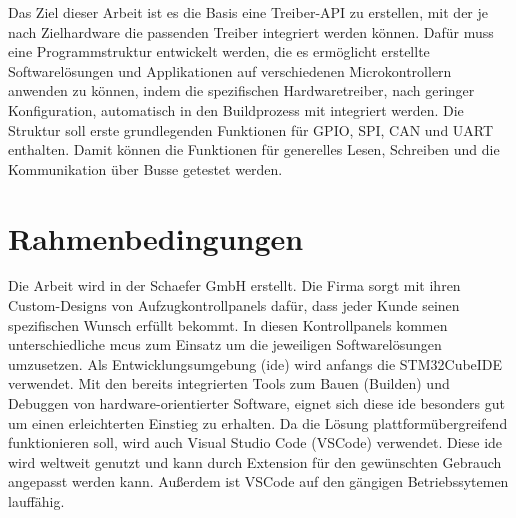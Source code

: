 Das Ziel dieser Arbeit ist es die Basis eine Treiber-API zu erstellen, mit der je nach Zielhardware die passenden Treiber integriert werden können.
Dafür muss eine Programmstruktur entwickelt werden, die es ermöglicht erstellte Softwarelösungen und Applikationen auf verschiedenen Microkontrollern anwenden zu können, indem die spezifischen Hardwaretreiber, nach geringer Konfiguration, automatisch in den Buildprozess mit integriert werden.
Die Struktur soll erste grundlegenden Funktionen für GPIO, SPI, CAN und UART enthalten. 
Damit können die Funktionen für generelles Lesen, Schreiben und die Kommunikation über Busse getestet werden.
\\
%
%
%




\section{Rahmenbedingungen}
Die Arbeit wird in der Schaefer GmbH erstellt. 
Die Firma sorgt mit ihren Custom-Designs von Aufzugkontrollpanels dafür, dass jeder Kunde seinen spezifischen Wunsch erfüllt bekommt.
In diesen Kontrollpanels kommen unterschiedliche \gls{mcu}s zum Einsatz um die jeweiligen Softwarelösungen umzusetzen.
Als Entwicklungsumgebung (\gls{ide}) wird anfangs die STM32CubeIDE verwendet.
Mit den bereits integrierten Tools zum Bauen (Builden) und Debuggen von hardware-orientierter Software, eignet sich diese \gls{ide} besonders gut um einen erleichterten Einstieg zu erhalten.
Da die Lösung plattformübergreifend funktionieren soll, wird auch Visual Studio Code (VSCode) verwendet.
Diese \gls{ide} wird weltweit genutzt und kann durch Extension für den gewünschten Gebrauch angepasst werden kann. 
Außerdem ist VSCode auf den gängigen Betriebssytemen lauffähig.

